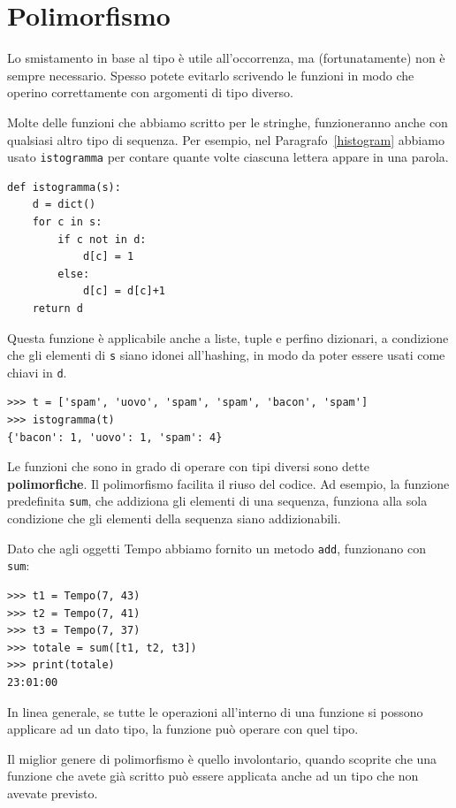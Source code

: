 \documentclass[10pt]{book}
\begin{document}
\section{Polimorfismo}
\label{polymorphism}

Lo smistamento in base al tipo è utile all'occorrenza, ma (fortunatamente) non è sempre necessario. Spesso potete evitarlo scrivendo le funzioni in modo che operino correttamente con argomenti di tipo diverso.

Molte delle funzioni che abbiamo scritto per le stringhe, funzioneranno anche con qualsiasi altro tipo di sequenza.
Per esempio, nel Paragrafo~\ref{histogram}
abbiamo usato {\tt istogramma} per contare quante volte ciascuna lettera appare in una parola.

\begin{verbatim}
def istogramma(s):
    d = dict()
    for c in s:
        if c not in d:
            d[c] = 1
        else:
            d[c] = d[c]+1
    return d
\end{verbatim}
%
Questa funzione è applicabile anche a liste, tuple e perfino dizionari, a condizione che gli elementi di {\tt s} siano idonei all'hashing, in modo da poter essere usati come chiavi in {\tt d}.

\begin{verbatim}
>>> t = ['spam', 'uovo', 'spam', 'spam', 'bacon', 'spam']
>>> istogramma(t)
{'bacon': 1, 'uovo': 1, 'spam': 4}
\end{verbatim}
%
Le funzioni che sono in grado di operare con tipi diversi sono dette {\bf polimorfiche}.
Il polimorfismo facilita il riuso del codice.  Ad esempio, la funzione predefinita {\tt sum}, che addiziona gli elementi di una sequenza, funziona alla sola condizione che gli elementi della sequenza siano addizionabili.

Dato che agli oggetti Tempo abbiamo fornito un metodo {\tt add}, funzionano con
{\tt sum}:

\begin{verbatim}
>>> t1 = Tempo(7, 43)
>>> t2 = Tempo(7, 41)
>>> t3 = Tempo(7, 37)
>>> totale = sum([t1, t2, t3])
>>> print(totale)
23:01:00
\end{verbatim}
%
In linea generale, se tutte le operazioni all'interno di una funzione si possono applicare ad un dato tipo, la funzione può operare con quel tipo.

Il miglior genere di polimorfismo è quello involontario, quando scoprite che una funzione che avete già scritto può essere applicata anche ad un tipo che non avevate previsto.
\end{document}
